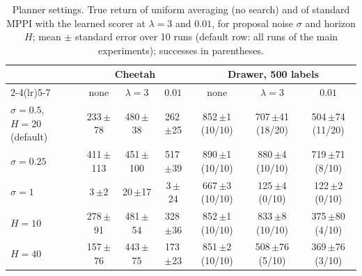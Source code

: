 \begin{table}[t]
\centering
\caption{Planner settings. True return of uniform averaging (no search) and of standard MPPI with the learned scorer at $\lambda=3$ and $0.01$, for proposal noise $\sigma$ and horizon $H$; mean $\pm$ standard error over 10 runs (default row: all runs of the main experiments); successes in parentheses.}
\label{tab:sens}
\small
\begin{tabular}{lcccccc}
\toprule
& \multicolumn{3}{c}{Cheetah} & \multicolumn{3}{c}{Drawer, 500 labels} \\
\cmidrule(lr){2-4}\cmidrule(lr){5-7}
& none & $\lambda=3$ & $0.01$ & none & $\lambda=3$ & $0.01$ \\
\midrule
$\sigma=0.5$, $H=20$ (default) & 233\,{\scriptsize$\pm$78} & 480\,{\scriptsize$\pm$38} & 262\,{\scriptsize$\pm$25} & 852\,{\scriptsize$\pm$1} (10/10) & 707\,{\scriptsize$\pm$41} (18/20) & 504\,{\scriptsize$\pm$74} (11/20) \\
$\sigma=0.25$ & 411\,{\scriptsize$\pm$113} & 451\,{\scriptsize$\pm$100} & 517\,{\scriptsize$\pm$39} & 890\,{\scriptsize$\pm$1} (10/10) & 880\,{\scriptsize$\pm$4} (10/10) & 719\,{\scriptsize$\pm$71} (8/10) \\
$\sigma=1$ & 3\,{\scriptsize$\pm$2} & 20\,{\scriptsize$\pm$17} & 3\,{\scriptsize$\pm$24} & 667\,{\scriptsize$\pm$3} (10/10) & 125\,{\scriptsize$\pm$4} (0/10) & 122\,{\scriptsize$\pm$2} (0/10) \\
$H=10$ & 278\,{\scriptsize$\pm$91} & 481\,{\scriptsize$\pm$54} & 328\,{\scriptsize$\pm$36} & 852\,{\scriptsize$\pm$1} (10/10) & 833\,{\scriptsize$\pm$8} (10/10) & 375\,{\scriptsize$\pm$80} (4/10) \\
$H=40$ & 157\,{\scriptsize$\pm$76} & 443\,{\scriptsize$\pm$75} & 173\,{\scriptsize$\pm$23} & 851\,{\scriptsize$\pm$2} (10/10) & 508\,{\scriptsize$\pm$76} (5/10) & 369\,{\scriptsize$\pm$76} (3/10) \\
\bottomrule
\end{tabular}
\end{table}
